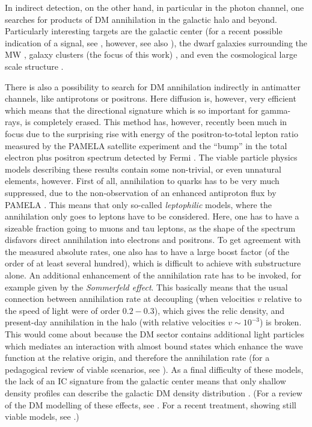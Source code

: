 \documentclass[10pt,aps,pra,reprint,amsmath,amsfonts,amssymb,showpacs,nofootinbib,floatfix]{revtex4-1}
\begin{document}
In indirect detection, on the other hand, in particular in the photon
channel, one searches for products of DM annihilation in the galactic
halo and beyond. Particularly interesting targets are the galactic
center (for a recent possible indication of a signal, see
\cite{2010arXiv1010.2752H}, however, see also \cite{2010arXiv1012.5839B}), the dwarf galaxies surrounding the MW
\cite{Strigari:2006rd,Essig:2009jx,2010JCAP...01..031S}, galaxy
clusters (the focus of this work)
\cite{Ghigna:1998vn,Lewis:2002mfa,Boyarsky:2006kc,2006A&A...455...21C,2009PhRvL.103r1302P},
and even the cosmological large scale structure
\cite{Bergstrom:2001jj,Ullio:2002pj,Taylor:2002zd,Elsaesser:2004ap,2011MNRAS.tmp..503C,Abazajian:2010sq,Abdo:2010dk,Zavala:2011tt}.

There is also a possibility to search for DM annihilation indirectly
in antimatter channels, like antiprotons or positrons. Here diffusion
is, however, very efficient which means that the directional signature
which is so important for gamma-rays, is completely erased. This
method has, however, recently been much in focus due to the surprising
rise with energy of the positron-to-total lepton ratio measured by the
PAMELA satellite experiment \cite{Adriani:2008zr} and the ``bump'' in
the total electron plus positron spectrum detected by Fermi
\cite{Abdo:2009zk}. The viable particle physics models describing
these results contain some non-trivial, or even unnatural elements,
however. First of all, annihilation to quarks has to be very much
suppressed, due to the non-observation of an enhanced antiproton flux
by PAMELA \cite{Adriani:2010rc}. This means that only so-called {\em
  leptophilic} models, where the annihilation only goes to leptons
have to be considered. Here, one has to have a sizeable fraction going
to muons and tau leptons, as the shape of the spectrum disfavors
direct annihilation into electrons and positrons. To get agreement
with the measured absolute rates, one also has to have a large boost
factor (of the order of at least several hundred), which is difficult
to achieve with substructure alone. An additional enhancement of the
annihilation rate has to be invoked, for example given by the {\em
  Sommerfeld effect}. This basically means that the usual connection
between annihilation rate at decoupling (when velocities $v$ relative
to the speed of light were of order $0.2 - 0.3$), which gives the
relic density, and present-day annihilation in the halo (with relative
velocities $v\sim 10^{-3}$) is broken. This would come about because
the DM sector contains additional light particles which mediates an
interaction with almost bound states which enhance the wave function
at the relative origin, and therefore the annihilation rate (for a
pedagogical review of viable scenarios, see
\cite{ArkaniHamed:2008qn}). As a final difficulty of these models, the
lack of an IC signature from the galactic center means that only
shallow density profiles can describe the galactic DM density
distribution
\cite{Bertone:2008xr,Cirelli:2008pk,Bergstrom:2008ag}. (For a review
of the DM modelling of these effects, see \cite{Bergstrom:2009ib}. For
a recent treatment, showing still viable models, see
\cite{Finkbeiner:2010sm}.)
\end{document}
